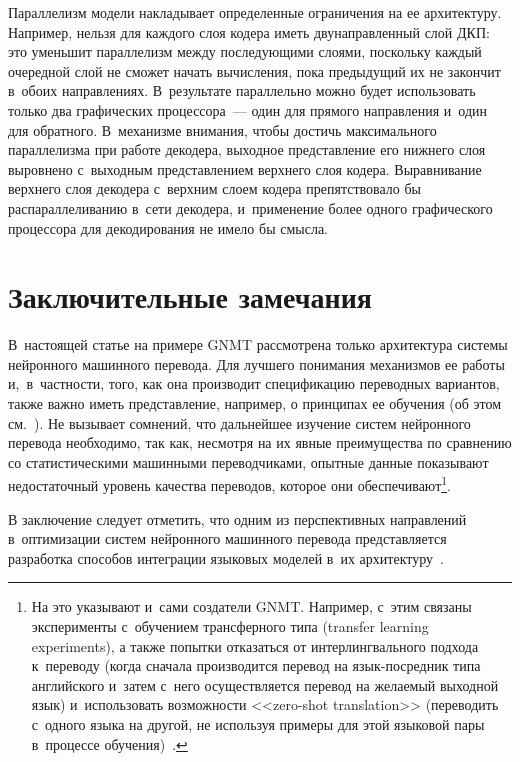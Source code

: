 \begin{multicols}{2}
  Параллелизм модели накладывает определенные ограничения на ее 
архитектуру. Например, нельзя для каждого слоя кодера иметь 
дву\-на\-прав\-лен\-ный слой ДКП: это уменьшит параллелизм между последующими 
слоями, поскольку каж\-дый очередной слой не сможет начать вычисления, пока 
предыдущий их не закончит в~обоих направлениях. В~результате параллельно 
можно будет использовать только два графических процессора~--- один для 
прямого направления и~один для обратного. В~механизме внимания, чтобы 
достичь максимального параллелизма при работе декодера, выходное 
представление его нижнего слоя выровнено с~выходным представлением 
верхнего слоя кодера. Выравнивание верхнего слоя декодера с~верхним слоем 
кодера препятствовало бы распараллеливанию в~сети декодера, и~применение 
более одного графического процессора для декодирования не имело бы \mbox{смысла.}
{

}

  
  \section{Заключительные замечания}
  
В~настоящей статье на примере GNMT рассмотрена только архитектура системы нейронного машинного 
перевода. Для лучшего понимания механизмов ее работы и,~в~частности, того, как она производит 
спецификацию переводных вариантов, также важно иметь представление, например, о принципах ее обучения 
(об этом см.~\cite{9-nur, 10-nur}). Не вызывает сомнений, что дальнейшее изучение систем нейронного 
перевода необходимо, так как, несмотря на их явные преимущества по сравнению со статистическими 
машинными переводчиками, опытные данные показывают недостаточный уровень качества переводов, 
которое они обеспечивают\footnote{На это указывают и~сами создатели GNMT. Например, с~этим связаны 
эксперименты с~обучением трансферного типа (transfer learning experiments), а также попытки отказаться от 
интерлингвального подхода к~переводу (когда сначала производится перевод на язык-посредник типа 
английского и~затем с~него осуществляется перевод на желаемый выходной язык) и~использовать возможности 
<<zero-shot translation>> (переводить с~одного языка на другой, не используя примеры для этой языковой пары в~процессе обучения)~\cite{10-nur}.}.

  
  В заключение следует отметить, что одним из перспективных направлений 
  в~оптимизации систем нейронного машинного перевода представляется 
разработка способов интеграции языковых моделей в~их  
архитектуру~\cite{25-nur}.
  

\end{multicols}
